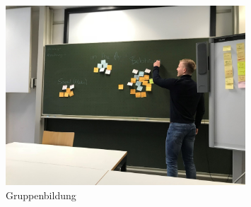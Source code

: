 \begin{figure}[h]
\centering
\includegraphics[width=0.8\textwidth]{images/design_thinking/04}
\caption[Gruppenbildung]{Gruppenbildung}
\label{fig:design_thinking:04}
\end{figure} 
 